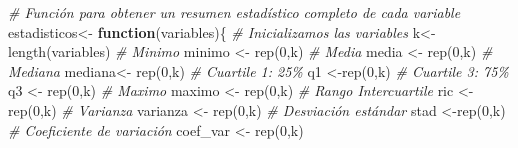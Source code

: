 \documentclass{staprojteamusb}
\newenvironment{Shaded}{\begin{snugshade}}{\end{snugshade}}
\newcommand{\CommentTok}[1]{\textcolor[rgb]{0.56,0.35,0.01}{\textit{#1}}}
\newcommand{\ControlFlowTok}[1]{\textcolor[rgb]{0.13,0.29,0.53}{\textbf{#1}}}
\newcommand{\DecValTok}[1]{\textcolor[rgb]{0.00,0.00,0.81}{#1}}
\newcommand{\FunctionTok}[1]{\textcolor[rgb]{0.00,0.00,0.00}{#1}}
\newcommand{\NormalTok}[1]{#1}
\newcommand{\OtherTok}[1]{\textcolor[rgb]{0.56,0.35,0.01}{#1}}
\begin{document}
\begin{Shaded}
\begin{Highlighting}[]
\CommentTok{\# Función para obtener un resumen estadístico completo de cada variable}
\NormalTok{estadisticos}\OtherTok{\textless{}{-}} \ControlFlowTok{function}\NormalTok{(variables)\{}
  \CommentTok{\# Inicializamos las variables}
\NormalTok{  k}\OtherTok{\textless{}{-}} \FunctionTok{length}\NormalTok{(variables)}
  \CommentTok{\# Minimo }
\NormalTok{  minimo }\OtherTok{\textless{}{-}} \FunctionTok{rep}\NormalTok{(}\DecValTok{0}\NormalTok{,k)}
  \CommentTok{\# Media}
\NormalTok{  media }\OtherTok{\textless{}{-}} \FunctionTok{rep}\NormalTok{(}\DecValTok{0}\NormalTok{,k)}
  \CommentTok{\# Mediana}
\NormalTok{  mediana}\OtherTok{\textless{}{-}} \FunctionTok{rep}\NormalTok{(}\DecValTok{0}\NormalTok{,k)}
  \CommentTok{\# Cuartile 1: 25\%}
\NormalTok{  q1 }\OtherTok{\textless{}{-}}\FunctionTok{rep}\NormalTok{(}\DecValTok{0}\NormalTok{,k)}
  \CommentTok{\# Cuartile 3: 75\%}
\NormalTok{  q3 }\OtherTok{\textless{}{-}} \FunctionTok{rep}\NormalTok{(}\DecValTok{0}\NormalTok{,k)}
  \CommentTok{\# Maximo }
\NormalTok{  maximo }\OtherTok{\textless{}{-}} \FunctionTok{rep}\NormalTok{(}\DecValTok{0}\NormalTok{,k)}
  \CommentTok{\# Rango Intercuartile }
\NormalTok{  ric }\OtherTok{\textless{}{-}} \FunctionTok{rep}\NormalTok{(}\DecValTok{0}\NormalTok{,k)}
  \CommentTok{\# Varianza }
\NormalTok{  varianza }\OtherTok{\textless{}{-}} \FunctionTok{rep}\NormalTok{(}\DecValTok{0}\NormalTok{,k)}
  \CommentTok{\# Desviación estándar}
\NormalTok{  stad }\OtherTok{\textless{}{-}}\FunctionTok{rep}\NormalTok{(}\DecValTok{0}\NormalTok{,k)}
  \CommentTok{\# Coeficiente de variación}
\NormalTok{  coef\_var }\OtherTok{\textless{}{-}}  \FunctionTok{rep}\NormalTok{(}\DecValTok{0}\NormalTok{,k)}
  

\end{Highlighting}
\end{Shaded}
\end{document}
